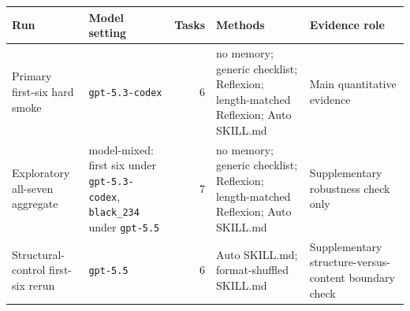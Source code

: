 \begin{tabular}{p{.20\linewidth}p{.16\linewidth}rp{.22\linewidth}p{.20\linewidth}}
\toprule
Run & Model setting & Tasks & Methods & Evidence role \\
\midrule
Primary first-six hard smoke & \texttt{gpt-5.3-codex} & 6 & no memory; generic checklist; Reflexion; length-matched Reflexion; Auto SKILL.md & Main quantitative evidence \\
Exploratory all-seven aggregate & model-mixed: first six under \texttt{gpt-5.3-codex}, \texttt{black\_234} under \texttt{gpt-5.5} & 7 & no memory; generic checklist; Reflexion; length-matched Reflexion; Auto SKILL.md & Supplementary robustness check only \\
Structural-control first-six rerun & \texttt{gpt-5.5} & 6 & Auto SKILL.md; format-shuffled SKILL.md & Supplementary structure-versus-content boundary check \\
\bottomrule
\end{tabular}
